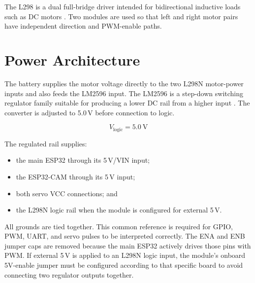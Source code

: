 \documentclass[12pt,a4paper,oneside]{report}
\begin{document}
The L298 is a dual full-bridge driver intended for bidirectional inductive loads
such as DC motors \cite{l298}. Two modules are used so that left and right
motor pairs have independent direction and PWM-enable paths.

\section{Power Architecture}
The battery supplies the motor voltage directly to the two L298N motor-power
inputs and also feeds the LM2596 input. The LM2596 is a step-down switching
regulator family suitable for producing a lower DC rail from a higher input
\cite{lm2596}. The converter is adjusted to 5.0\,V before connection to logic.

\begin{equation}
  V_{\text{logic}} = 5.0~\text{V}
\end{equation}

The regulated rail supplies:

\begin{itemize}
  \item the main ESP32 through its 5\,V/VIN input;
  \item the ESP32-CAM through its 5\,V input;
  \item both servo VCC connections; and
  \item the L298N logic rail when the module is configured for external 5\,V.
\end{itemize}

All grounds are tied together. This common reference is required for GPIO,
PWM, UART, and servo pulses to be interpreted correctly. The ENA and ENB jumper
caps are removed because the main ESP32 actively drives those pins with PWM.
If external 5\,V is applied to an L298N logic input, the module's onboard
5V-enable jumper must be configured according to that specific board to avoid
connecting two regulator outputs together.
\end{document}
